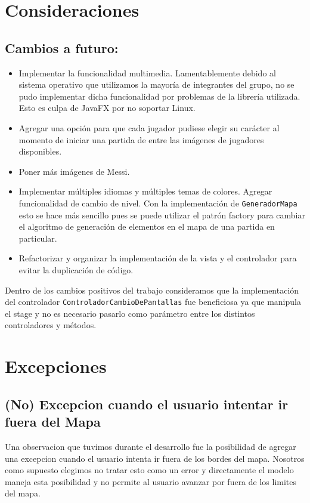 \documentclass[titlepage,a4paper]{article}
\begin{document}
\section{Consideraciones}
\label{sec:orged4d3e9}

\subsection{Cambios a futuro:}
\label{sec:orgba83bff}

\begin{itemize}
\item Implementar la funcionalidad multimedia. Lamentablemente debido al
sistema operativo que utilizamos la mayoría de integrantes del grupo,
no se pudo implementar dicha funcionalidad por problemas de la
librería utilizada. Esto es culpa de JavaFX por no soportar Linux.

\item Agregar una opción para que cada jugador pudiese elegir su carácter al
momento de iniciar una partida de entre las imágenes de jugadores
disponibles.

\item Poner más imágenes de Messi.

\item Implementar múltiples idiomas y múltiples temas de colores.
Agregar funcionalidad de cambio de nivel. Con la implementación de
\texttt{GeneradorMapa} esto se hace más sencillo pues se puede utilizar el
patrón factory para cambiar el algoritmo de generación de elementos en
el mapa de una partida en particular.

\item Refactorizar y organizar la implementación de la vista y el
controlador para evitar la duplicación de código.
\end{itemize}

Dentro de los cambios positivos del trabajo consideramos que la
implementación del controlador \texttt{ControladorCambioDePantallas} fue
beneficiosa ya que manipula el stage y no es necesario pasarlo como
parámetro entre los distintos controladores y métodos.

\section{Excepciones}
\label{sec:org3cf9330}
\subsection{(No) Excepcion cuando el usuario intentar ir fuera del Mapa}
\label{sec:orgca975ba}

Una observacion que tuvimos durante el desarrollo fue la posibilidad
de agregar una excepcion cuando el usuario intenta ir fuera de los
bordes del mapa. Nosotros como supuesto elegimos no tratar esto como
un error y directamente el modelo maneja esta posibilidad y no permite
al usuario avanzar por fuera de los limites del mapa.
\end{document}

